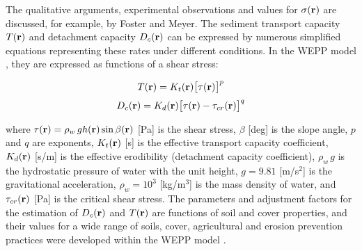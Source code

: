 \documentclass[fleqn,12pt,twoside]{article}
\begin{document}
\noindent
The qualitative arguments, experimental observations and values for
 $\sigma({\bf r})$   are discussed, for example, by Foster and Meyer\cite{fostermeyer72}.
The sediment transport capacity $T({\bf r})$ and detachment capacity $D_c({\bf r})$ 
can be expressed by numerous simplified equations representing these rates under
different conditions. In the WEPP model \cite{wepp95}, they are expressed as functions
of a shear stress:

\begin{equation}
T({\bf r})=K_t({\bf r}) \bigl[\tau({\bf r})\bigr]^p
\end{equation}
\begin{equation}
D_c({\bf r})=K_d({\bf r}) \bigl[\tau({\bf r}) - \tau_{cr}({\bf r})\bigr]^q
\end{equation}

\noindent
where $\tau({\bf r})=\rho_w\, g h({\bf r}) \sin \beta({\bf r})$ 
[Pa] is the shear stress,
$ \beta$ [deg] is the slope angle,
$p$ and $q$ are exponents,
$ K_t({\bf r})$ [s] is the effective transport capacity coefficient,
$K_d({\bf r})$ [s/m] is the effective erodibility
(detachment capacity coefficient),
$\rho_w\, g$  is the hydrostatic pressure
of water with the unit height,
$ g=9.81$ [m/s$^2$] is the gravitational acceleration,
$\rho_w=10^3$ [kg/m$^3$] is the  mass density of water,
and
$\tau_{cr}({\bf r})$ [Pa] is the critical shear stress.
The parameters and adjustment factors for the estimation of
$D_c ({\bf r})$ and $T({\bf r})$
are functions of soil and cover properties, and their values
for a wide range of soils, cover, agricultural and
erosion prevention practices
were developed within the WEPP model \cite{wepp95}.
\end{document}
